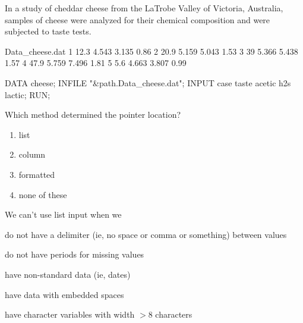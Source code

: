 \begin{frame}[fragile]
In a study of cheddar cheese from the LaTrobe Valley of Victoria, Australia, samples of cheese were analyzed for their chemical composition and were subjected to taste tests.\\
\vskip10pt
\hspace*{-0.3in}
\emp
\blankcolumn
{}
\begin{craw}{.0}{Data\_cheese.dat}
1  12.3 4.543   3.135   0.86
2  20.9 5.159   5.043   1.53
3  39   5.366   5.438   1.57
4  47.9 5.759   7.496   1.81
5  5.6  4.663   3.807   0.99
\end{craw}
\emp
\end{frame}

\begin{frame}[fragile]
\footnotesize
\begin{code}{.0}
DATA cheese;
   INFILE "\&path.Data\_cheese.dat";
   INPUT case taste acetic h2s lactic;
RUN;
\end{code}
\emp
\vskip10pt
\begin{clicker}{Which method determined the pointer location?}
\begin{enumerate}
\item list
\item column
\item formatted
\item none of these
\end{enumerate}
\end{clicker}
\end{frame}

\begin{frame}
We can't use list input when we
\bi
\item do not have a delimiter (ie, no space or comma or something) between values
\item do not have periods for missing values
\item have non-standard data (ie, dates)
\item have data with embedded spaces
\item have character variables with width $>8$  characters
\ei
\end{frame}

